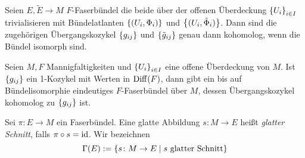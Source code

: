 \begin{proposition}
  Seien $E,\tilde E \to M$ $F$-Faserbündel die beide über der offenen
  Überdeckung $\left\lbrace U_i \right\rbrace_{i\in I}$ trivialisieren mit Bündelatlanten
  $\left\lbrace (U_i,\Phi_i) \right\rbrace$ und $\left\lbrace (U_i,\tilde \Phi_i) \right\rbrace$. Dann sind die
  zugehörigen Übergangskozykel $\left\lbrace g_{ij} \right\rbrace$ und
  $\left\lbrace \tilde{g}_{ij} \right\rbrace$ genau dann kohomolog, wenn die Bündel
  isomorph sind.
\end{proposition}

\begin{satz}
  Seien $M,F$ Mannigfaltigkeiten und $\left\lbrace U_i \right\rbrace_{i\in I}$ eine offene
  Überdeckung von $M$. Ist $\left\lbrace g_{ij} \right\rbrace$ ein 1-Kozykel mit Werten in
  $\operatorname{Diff}(F)$, dann gibt ein bis auf Bündelisomorphie eindeutiges
  $F$-Faserbündel über $M$, dessen Übergangskozykel kohomolog zu
  $\left\lbrace g_{ij} \right\rbrace$ ist.
\end{satz}

\begin{definition}
  Sei $\pi\colon E \to M$ ein Faserbündel. Eine glatte Abbildung $s \colon M \to E$
  heißt \emph{glatter Schnitt}, falls $\pi\circ s = \operatorname{id}$. Wir
  bezeichnen
  \begin{equation*}
    \Gamma(E) := \left\lbrace s\colon M \to E\mid s\text{ glatter Schnitt} \right\rbrace
  \end{equation*}
\end{definition}

